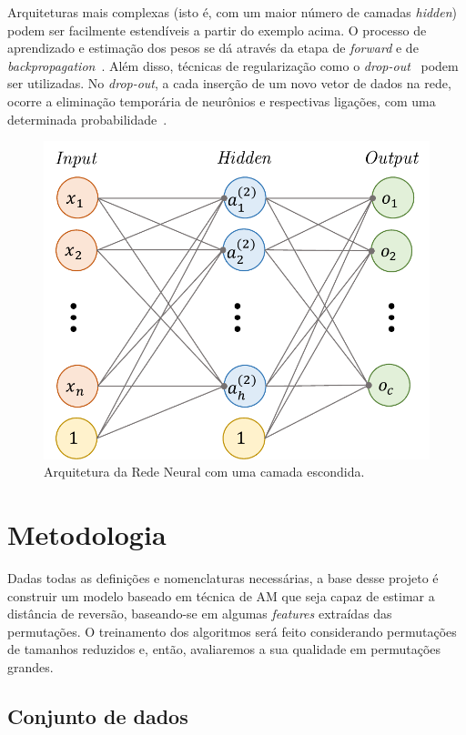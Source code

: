 \documentclass[runningheads,a4paper]{llncs}
\begin{document}
Arquiteturas mais complexas (isto é, com um maior número de camadas \textit{hidden}) podem ser facilmente estendíveis a partir do exemplo acima. O processo de aprendizado e estimação dos pesos se dá através da etapa de \textit{forward} e de \textit{backpropagation}~\cite{Bishop}. Além disso, técnicas de regularização como o \textit{drop-out}~\cite{Bishop} podem ser utilizadas. No \textit{drop-out}, a cada inserção de um novo vetor de dados na rede, ocorre a eliminação temporária de neurônios e respectivas ligações, com uma determinada probabilidade~\cite{Neter}.

\begin{figure}[ht]
	\centering
	\includegraphics[scale=0.3]{arquitetura-nn.pdf}
	\caption{Arquitetura da Rede Neural com uma camada escondida.}
	\label{fig:arquitetura-nn}
\end{figure}

\section{Metodologia}

Dadas todas as definições e nomenclaturas necessárias, a base desse projeto é construir um modelo baseado em técnica de AM que seja capaz de estimar a distância de reversão, baseando-se em algumas \textit{features} extraídas das permutações. O treinamento dos algoritmos será feito considerando permutações de tamanhos reduzidos e, então, avaliaremos a sua qualidade em permutações grandes.

\subsection{Conjunto de dados}
\end{document}
